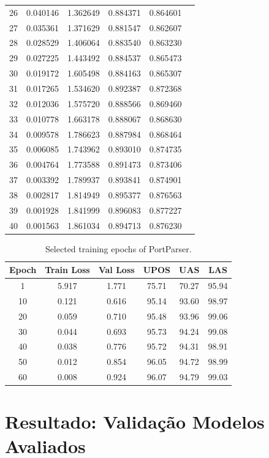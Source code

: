 \begin{table}[ht]
\begin{tabular}{c c c c c c}
26 & 0.040146 & 1.362649 & 0.884371 & 0.864601 \\
27 & 0.035361 & 1.371629 & 0.881547 & 0.862607 \\
28 & 0.028529 & 1.406064 & 0.883540 & 0.863230 \\
29 & 0.027225 & 1.443492 & 0.884537 & 0.865473 \\
30 & 0.019172 & 1.605498 & 0.884163 & 0.865307 \\
31 & 0.017265 & 1.534620 & 0.892387 & 0.872368 \\
32 & 0.012036 & 1.575720 & 0.888566 & 0.869460 \\
33 & 0.010778 & 1.663178 & 0.888067 & 0.868630 \\
34 & 0.009578 & 1.786623 & 0.887984 & 0.868464 \\
35 & 0.006085 & 1.743962 & 0.893010 & 0.874735 \\
36 & 0.004764 & 1.773588 & 0.891473 & 0.873406 \\
37 & 0.003392 & 1.789937 & 0.893841 & 0.874901 \\
38 & 0.002817 & 1.814949 & 0.895377 & 0.876563 \\
39 & 0.001928 & 1.841999 & 0.896083 & 0.877227 \\
40 & 0.001563 & 1.861034 & 0.894713 & 0.876230 \\
\hline
\end{tabular}
\end{table}
\begin{table}[ht]
\centering
\caption{Selected training epochs of PortParser.}
\label{tab:portparser_training}
\begin{tabular}{cccccc}
\hline
Epoch & Train Loss & Val Loss & UPOS & UAS & LAS \\
\hline
1  & 5.917 & 1.771 & 75.71 & 70.27 & 95.94 \\
10 & 0.121 & 0.616 & 95.14 & 93.60 & 98.97 \\
20 & 0.059 & 0.710 & 95.48 & 93.96 & 99.06 \\
30 & 0.044 & 0.693 & 95.73 & 94.24 & 99.08 \\
40 & 0.038 & 0.776 & 95.72 & 94.31 & 98.91 \\
50 & 0.012 & 0.854 & 96.05 & 94.72 & 98.99 \\
60 & 0.008 & 0.924 & 96.07 & 94.79 & 99.03 \\
\hline
\end{tabular}
\end{table}

\section{Resultado: Validação Modelos Avaliados}
\label{cap:modelos_validacao}



